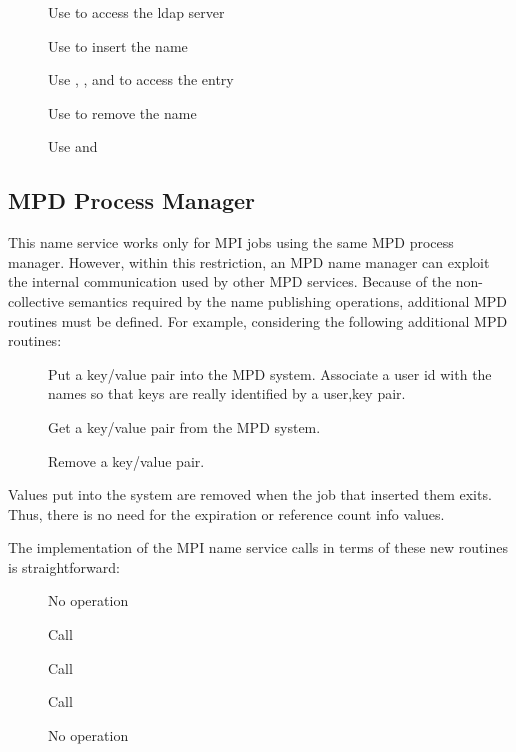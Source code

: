 \documentclass{article}
\begin{document}
\begin{description}
\item[]Use  to access the ldap server
\item[]Use  to insert the name
\item[]Use , , and
   to access the entry
\item[]Use  to remove the name
\item[]Use  and 
\end{description}

\subsection{MPD Process Manager}
\label{sec:namepub-mpd}

This name service works only for MPI jobs using the same MPD process
manager.  However, within this restriction, an MPD name manager can
exploit the internal communication used by other MPD services.
Because of the non-collective semantics required by the name
publishing operations, additional MPD routines must
be defined.  For example, considering the following additional MPD
routines:
\begin{description}
\item[]Put a key/value pair into the MPD system.
  Associate a user id with the names so that keys are really
  identified by a user,key pair.
\item[]Get a key/value pair from the MPD system.
\item[]Remove a key/value pair.
\end{description}
Values put into the system are removed when the job that inserted them
exits.  Thus, there is no need for the expiration or reference count
info values.  

The implementation of the MPI name service calls in terms of these new
 routines is straightforward:

\begin{description}
\item[]No operation
\item[]Call 
\item[]Call 
\item[]Call 
\item[]No operation
\end{description}
\end{document}
